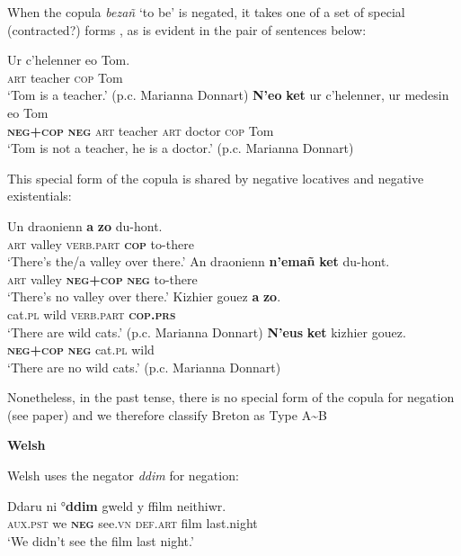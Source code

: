 ﻿\documentclass[output=paper]{langsci/langscibook}
\begin{document}
\begin{unindented}
When the copula \textit{bezañ} `to be' \citep[144]{Press1986} is negated, it takes one of a set of special (contracted?) forms \citep[152]{Press1986}, as is evident in the pair of sentences below:
%
\begin{exe}\ex \gll Ur   c’helenner eo    Tom. \\
\textsc{art} teacher \textsc{cop} Tom \\
    \glt `Tom is a teacher.' (p.c. Marianna Donnart)
\ex \gll \textbf{N’eo} \textbf{ket} ur c’helenner, ur medesin eo Tom \\
\textbf{\textsc{neg+cop}} \textbf{\textsc{neg}} \textsc{art} teacher        \textsc{art} doctor    \textsc{cop} Tom \\
    \glt `Tom is not a teacher, he is a doctor.' (p.c. Marianna Donnart)
    \end{exe}

This special form of the copula is shared by negative locatives and negative existentials:
%
\begin{exe}\ex \gll Un  draonienn \textbf{a} \textbf{zo}   du-hont. \\
\textsc{art} valley \textsc{verb.part} \textbf{\textsc{cop}} to-there \\
    \glt `There's the/a valley over there.' \citep[154]{Press1986}
\ex \gll
An   draonienn \textbf{n’emañ}     \textbf{ket}  du-hont. \\
\textsc{art} valley \textbf{\textsc{neg+cop}} \textbf{\textsc{neg}} to-there \\
    \glt `There's no valley over there.' \citep[155]{Press1986}
\ex \gll Kizhier gouez \textbf{a} \textbf{zo}. \\
cat.\textsc{pl}   wild   \textsc{verb.part} \textbf{\textsc{cop.prs}} \\
    \glt `There are wild cats.' (p.c. Marianna Donnart)
\ex \gll \textbf{N’eus} \textbf{ket}   kizhier gouez. \\
\textbf{\textsc{neg+cop}} \textbf{\textsc{neg}} cat.\textsc{pl} wild \\
    \glt `There are no wild cats.' (p.c. Marianna Donnart)
    \end{exe}

Nonetheless, in the past tense, there is no special form of the copula for negation (see paper) and we therefore classify Breton as Type A{\textasciitilde}B

\textbf{Welsh}

Welsh uses the negator \textit{ddim} for negation:
%
\begin{exe}\ex \gll Ddaru ni °\textbf{ddim} gweld y ffilm neithiwr. \\
\textsc{aux.pst} we \textbf{\textsc{neg}} see.\textsc{vn} \textsc{def.art} film   last.night \\
    \glt `We didn't see the film last night.' \citep[190]{King2003}
    \end{exe}


\end{unindented}
\end{document}
